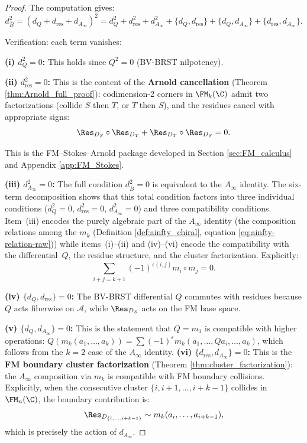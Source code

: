\begin{proof}
The computation gives:
\begin{equation}
d_{\overline{B}}^2 = (d_Q + d_{\text{res}} + d_{A_\infty})^2 = d_Q^2 + d_{\text{res}}^2 + d_{A_\infty}^2 + \{d_Q, d_{\text{res}}\} + \{d_Q, d_{A_\infty}\} + \{d_{\text{res}}, d_{A_\infty}\}.
\end{equation}

Verification: each term vanishes:

\textbf{(i) $d_Q^2 = 0$:} This holds since $Q^2 = 0$ (BV-BRST nilpotency).

\textbf{(ii) $d_{\text{res}}^2 = 0$:} This is the content of the \textbf{Arnold cancellation} (Theorem \ref{thm:Arnold_full_proof}): codimension-2 corners in $\FM_k(\C)$ admit two factorizations (collide $S$ then $T$, or $T$ then $S$), and the residues cancel with appropriate signs:
\begin{equation}
\Res_{D_S} \circ \Res_{D_T} + \Res_{D_T} \circ \Res_{D_S} = 0.
\end{equation}

This is the FM--Stokes--Arnold package developed in Section \ref{sec:FM_calculus} and Appendix \ref{app:FM_Stokes}.

\textbf{(iii) $d_{A_\infty}^2 = 0$:} The full condition $d_{\overline{B}}^2 = 0$ is equivalent to the $A_\infty$ identity. The six-term decomposition shows that this total condition factors into three individual conditions ($d_Q^2 = 0$, $d_{\mathrm{res}}^2 = 0$, $d_{A_\infty}^2 = 0$) and three compatibility conditions. Item~(iii) encodes the purely algebraic part of the $A_\infty$ identity (the composition relations among the $m_k$ (Definition \ref{def:ainfty_chiral}, equation \eqref{eq:ainfty-relation-raw})) while items~(i)--(ii) and (iv)--(vi) encode the compatibility with the differential~$Q$, the residue structure, and the cluster factorization. Explicitly:
\begin{equation}
\sum_{i+j=k+1} (-1)^{\varepsilon(i,j)} m_i \circ m_j = 0.
\end{equation}

\textbf{(iv) $\{d_Q, d_{\text{res}}\} = 0$:} The BV-BRST differential $Q$ commutes with residues because $Q$ acts fiberwise on $\mathcal{A}$, while $\Res_{D_S}$ acts on the FM base space.

\textbf{(v) $\{d_Q, d_{A_\infty}\} = 0$:} This is the statement that $Q = m_1$ is compatible with higher operations: $Q(m_k(a_1, \ldots, a_k)) = \sum (-1)^{\varepsilon} m_k(a_1, \ldots, Qa_i, \ldots, a_k)$, which follows from the $k=2$ case of the $A_\infty$ identity.
\textbf{(vi) $\{d_{\text{res}}, d_{A_\infty}\} = 0$:} This is the \textbf{FM boundary cluster factorization} (Theorem \ref{thm:cluster_factorization}): the $A_\infty$ composition via $m_k$ is compatible with FM boundary collisions. Explicitly, when the consecutive cluster $\{i, i+1, \ldots, i+k-1\}$ collides in $\FM_n(\C)$, the boundary contribution is:
\begin{equation}
\Res_{D_{\{i, \ldots, i+k-1\}}} \sim m_k(a_i, \ldots, a_{i+k-1}),
\end{equation}
which is precisely the action of $d_{A_\infty}$.


\end{proof}
